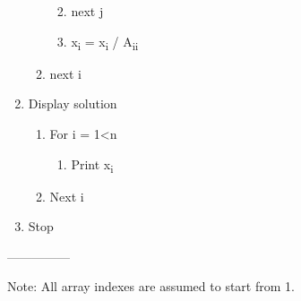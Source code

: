 \documentclass[12pt]{article}
\renewcommand{\_}{\kern-1.5pt\textunderscore\kern-1.5pt}
\begin{document}
\begin{enumerate}
\begin{enumerate}
\begin{enumerate}
\begin{enumerate}
\end{enumerate}
	\item next j\par

	\item x\textsubscript{i }= x\textsubscript{i }/ A\textsubscript{ii }\par


\end{enumerate}
	\item next i \par


\end{enumerate}
	\item  Display solution \par

\begin{enumerate}
	\item For i = 1<n\par

\begin{enumerate}
	\item Print x\textsubscript{i\  }\par


\end{enumerate}
	\item Next i \par


\end{enumerate}
	\item Stop 
\end{enumerate}\par

---------------\par

Note: All array indexes are assumed to start from 1.\par


\printbibliography
\end{document}

